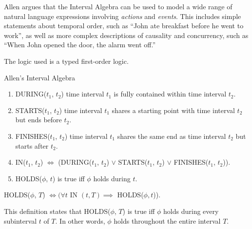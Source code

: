 Allen argues that the Interval Algebra can be used to model a wide range of natural language expressions involving \textit{actions} and \textit{events}. This includes simple statements about temporal order, such as ``John ate breakfast before he went to work'', as well as more complex descriptions of causality and concurrency, such as ``When John opened the door, the alarm went off.''


\pagebreak
The logic used is a typed first-order logic.

\begin{exmp} Allen's Interval Algebra

  \begin{enumerate}
    \item DURING($t_1$, $t_2$) time interval $t_1$ is fully contained within time interval $t_2$.

    \item STARTS($t_1$, $t_2$) time interval $t_1$ shares a starting point with time interval $t_2$ but ends before $t_2$.

    \item FINISHES($t_1$, $t_2$) time interval $t_1$ shares the same end as time interval $t_2$ but starts after $t_2$.

    \item IN($t_1$, $t_2$) $\iff$ (DURING($t_1$, $t_2$) $\lor$ STARTS($t_1$, $t_2$) $\lor$ FINISHES($t_1$, $t_2$)). 

    \item HOLDS(\(\phi\), \(t\)) is true iff \(\phi\) holds during \(t\).
  \end{enumerate}



  \begin{center}
    HOLDS(\(\phi\), \(T\)) \(\iff ( \forall t \) IN $ (t,T) \implies $ HOLDS($\phi, t$)).
  \end{center}

  This definition states that HOLDS($\phi$, $T$) is true iff $\phi$ holds during every subinterval $t$ of $T$. In other words, $\phi$ holds throughout the entire interval $T$.
\end{exmp}


